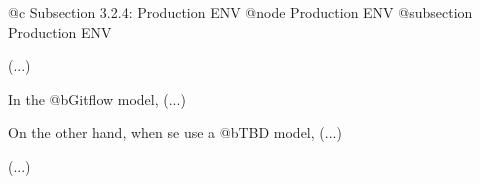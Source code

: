 @c Subsection 3.2.4: Production ENV
@node Production ENV
@subsection Production ENV

(...)

In the @b{Gitflow} model, (...)

On the other hand, when se use a @b{TBD} model, (...)

(...)
